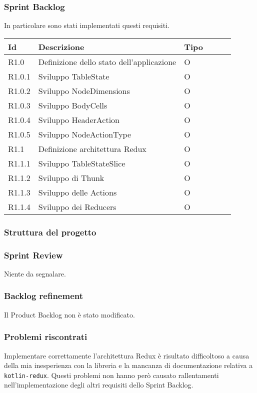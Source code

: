 \subsubsection{Sprint Backlog}
In particolare sono stati implementati questi requisiti.
\begin{longtable} {
		|>{}p{10mm}| 
		|>{}p{90mm}|
		|>{}p{15mm}|
		|>{}p{15mm}|
		|>{}p{15mm}|
		>{}p{0mm}}
	\hline
	\textbf{Id} & \textbf{Descrizione} & \textbf{Tipo} \\ \hline
	R1.0 & Definizione dello stato dell'applicazione & O \\ \hline
	R1.0.1 & Sviluppo TableState        & O\\ \hline
	R1.0.2 & Sviluppo NodeDimensions    & O\\ \hline
	R1.0.3 & Sviluppo BodyCells         & O\\ \hline
	R1.0.4 & Sviluppo HeaderAction      & O\\ \hline
	R1.0.5 & Sviluppo NodeActionType    & O\\ \hline
	R1.1   & Definizione architettura Redux & O\\ \hline
	R1.1.1 & Sviluppo TableStateSlice    & O\\ \hline
	R1.1.2 & Sviluppo di Thunk & O\\ \hline
	R1.1.3 & Sviluppo delle Actions & O\\ \hline
	R1.1.4 & Sviluppo dei Reducers & O\\ \hline
\end{longtable}

\subsubsection{Struttura del progetto}
\subsubsection{Sprint Review}
Niente da segnalare.

\subsubsection{Backlog refinement}
Il Product Backlog non è stato modificato.

\subsubsection{Problemi riscontrati}
Implementare correttamente l'architettura Redux è risultato difficoltoso a causa della mia inesperienza con la libreria e la mancanza di documentazione relativa a \verb|kotlin-redux|. Questi problemi non hanno però causato rallentamenti nell'implementazione degli altri requisiti dello Sprint Backlog.



